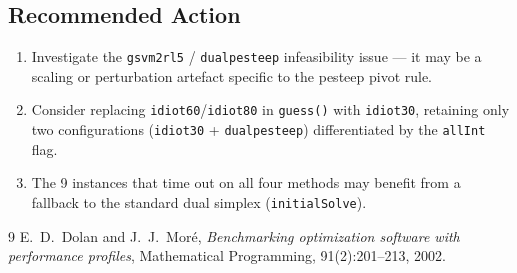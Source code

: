 \documentclass[11pt,a4paper]{article}
\begin{document}
\subsection{Recommended Action}
\begin{enumerate}
  \item Investigate the \texttt{gsvm2rl5} / \texttt{dualpesteep} infeasibility
        issue — it may be a scaling or perturbation artefact specific to the
        pesteep pivot rule.
  \item Consider replacing \texttt{idiot60}/\texttt{idiot80} in \texttt{guess()}
        with \texttt{idiot30}, retaining only two configurations
        (\texttt{idiot30} + \texttt{dualpesteep}) differentiated by the
        \texttt{allInt} flag.
  \item The 9 instances that time out on all four methods may benefit from a
        fallback to the standard dual simplex (\texttt{initialSolve}).
\end{enumerate}

\begin{thebibliography}{9}
  E.\ D.\ Dolan and J.\ J.\ Mor\'e,
  \textit{Benchmarking optimization software with performance profiles},
  Mathematical Programming, 91(2):201--213, 2002.
\end{thebibliography}
\end{document}
